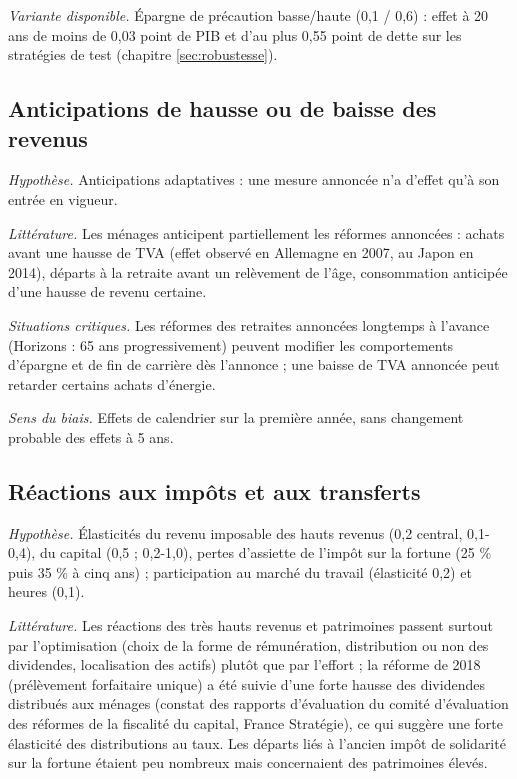 \documentclass[
  11pt,
  11pt,
  a4paper,
  openany]{book}
\begin{document}
\emph{Variante disponible.} Épargne de précaution basse/haute (0,1 /
0,6) : effet à 20 ans de moins de 0,03 point de PIB et d'au plus 0,55
point de dette sur les stratégies de test (chapitre
\ref{sec:robustesse}).

\hypertarget{anticipations-de-hausse-ou-de-baisse-des-revenus}{%
\subsection{Anticipations de hausse ou de baisse des
revenus}\label{anticipations-de-hausse-ou-de-baisse-des-revenus}}

\emph{Hypothèse.} Anticipations adaptatives : une mesure annoncée n'a
d'effet qu'à son entrée en vigueur.

\emph{Littérature.} Les ménages anticipent partiellement les réformes
annoncées : achats avant une hausse de TVA (effet observé en Allemagne
en 2007, au Japon en 2014), départs à la retraite avant un relèvement de
l'âge, consommation anticipée d'une hausse de revenu certaine.

\emph{Situations critiques.} Les réformes des retraites annoncées
longtemps à l'avance (Horizons : 65 ans progressivement) peuvent
modifier les comportements d'épargne et de fin de carrière dès l'annonce
; une baisse de TVA annoncée peut retarder certains achats d'énergie.

\emph{Sens du biais.} Effets de calendrier sur la première année, sans
changement probable des effets à 5 ans.

\hypertarget{ruxe9actions-aux-impuxf4ts-et-aux-transferts}{%
\subsection{Réactions aux impôts et aux
transferts}\label{ruxe9actions-aux-impuxf4ts-et-aux-transferts}}

\emph{Hypothèse.} Élasticités du revenu imposable des hauts revenus (0,2
central, 0,1-0,4), du capital (0,5 ; 0,2-1,0), pertes d'assiette de
l'impôt sur la fortune (25 \% puis 35 \% à cinq ans) ; participation au
marché du travail (élasticité 0,2) et heures (0,1).

\emph{Littérature.} Les réactions des très hauts revenus et patrimoines
passent surtout par l'optimisation (choix de la forme de rémunération,
distribution ou non des dividendes, localisation des actifs) plutôt que
par l'effort ; la réforme de 2018 (prélèvement forfaitaire unique) a été
suivie d'une forte hausse des dividendes distribués aux ménages (constat
des rapports d'évaluation du comité d'évaluation des réformes de la
fiscalité du capital, France Stratégie), ce qui suggère une forte
élasticité des distributions au taux. Les départs liés à l'ancien impôt
de solidarité sur la fortune étaient peu nombreux mais concernaient des
patrimoines élevés.
\end{document}

